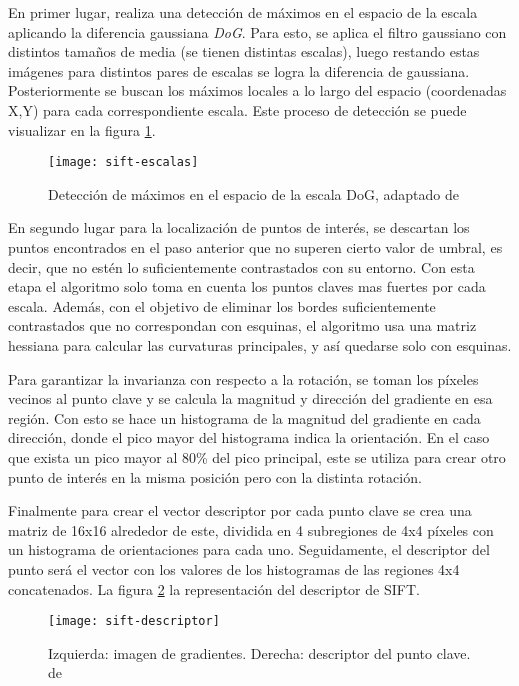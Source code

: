 En primer lugar, realiza una detección de máximos en el espacio de la escala aplicando la diferencia gaussiana \textit{DoG}. Para esto, se aplica el filtro gaussiano con distintos tamaños de media (se tienen distintas escalas), luego restando estas imágenes para distintos pares de escalas se logra la diferencia de gaussiana. Posteriormente se buscan los máximos locales a lo largo del espacio (coordenadas X,Y) para cada correspondiente escala. Este proceso de detección se puede visualizar en la figura \ref{imagen:sift-escalas}.

\begin{figure}[H]
	\centering
	\texttt{[image: sift-escalas]}
	\caption[Detector SIFT]{Detección de máximos en el espacio de la escala DoG, adaptado de \cite{sift}}
	\label{imagen:sift-escalas}
\end{figure}

En segundo lugar para la localización de puntos de interés, se descartan los puntos encontrados en el paso anterior que no superen cierto valor de umbral, es decir, que no estén lo suficientemente contrastados con su entorno. Con esta etapa el algoritmo solo toma en cuenta los puntos claves mas fuertes por cada escala. Además, con el objetivo de eliminar los bordes suficientemente contrastados que no correspondan con esquinas, el algoritmo usa una matriz hessiana para calcular las curvaturas principales, y así quedarse solo con esquinas.

Para garantizar la invarianza con respecto a la rotación, se toman los píxeles vecinos al punto clave y se calcula la magnitud y dirección del gradiente en esa región. Con esto se hace un histograma de la magnitud del gradiente en cada dirección, donde el pico mayor del histograma indica la orientación. En el caso que exista un pico mayor al 80\% del pico principal, este se utiliza para crear otro punto de interés en la misma posición pero con la distinta rotación.

Finalmente para crear el vector descriptor por cada punto clave se crea una matriz de 16x16 alrededor de este, dividida en 4 subregiones de 4x4 píxeles con un histograma de orientaciones para cada uno. Seguidamente, el descriptor del punto será el vector con los valores de los histogramas de las regiones 4x4 concatenados. La figura \ref{imagen:descriptor} la representación del descriptor de SIFT.

\begin{figure}[H]
	\centering
	\texttt{[image: sift-descriptor]}
	\caption[Descriptor SIFT]{Izquierda: imagen de gradientes. Derecha: descriptor del punto clave. de \cite{sift}}
	\label{imagen:descriptor}
\end{figure}


